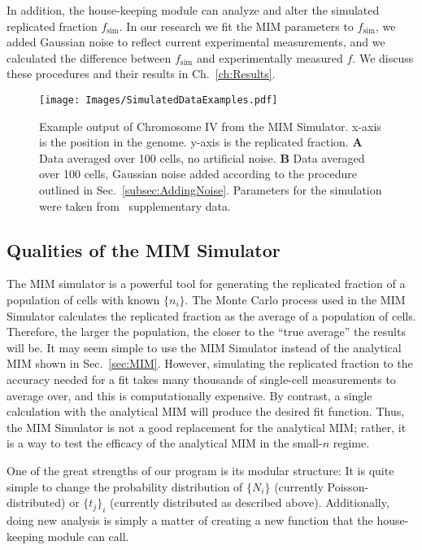 		In addition, the house-keeping module can analyze and alter the simulated replicated fraction $f_\text{sim}$.
		In our research we fit the MIM parameters to $f_\text{sim}$, we added Gaussian noise to reflect current experimental measurements, and we calculated the difference between $f_\text{sim}$ and experimentally measured $f$.
		We discuss these procedures and their results in Ch.~\ref{ch:Results}.
		
		\begin{figure}[tbh]
			\begin{center}
				\texttt{[image: Images/SimulatedDataExamples.pdf]}
			\end{center}
				\caption[Simulated Replicated Fraction Example]{\label{fig:SimulatedExample}
					Example output of Chromosome IV from the MIM Simulator.
					x-axis is the position in the genome.
					y-axis is the replicated fraction.
					\textbf{A} Data averaged over 100 cells, no artificial noise.
					\textbf{B} Data averaged over 100 cells, Gaussian noise added according to the procedure outlined in Sec.~\ref{subsec:AddingNoise}.
					Parameters for the simulation were taken from~\cite{ScottsPaper} supplementary data.
				}
		\end{figure}	
		
		
		\subsection{Qualities of the MIM Simulator}
		\label{subsec:QualitiesofMIMSimulator}
		
		The MIM simulator is a powerful tool for generating the replicated fraction of a population of cells with known $\{n_i\}$.
		The Monte Carlo process used in the MIM Simulator calculates the replicated fraction as the average of a population of cells.
		Therefore, the larger the population, the closer to the ``true average'' the results will be.
		It may seem simple to use the MIM Simulator instead of the analytical MIM shown in Sec.~\ref{sec:MIM}.
		However, simulating the replicated fraction to the accuracy needed for a fit takes many thousands of single-cell measurements to average over, and this is computationally expensive.
		By contrast, a single calculation with the analytical MIM will produce the desired fit function.
		Thus, the MIM Simulator is not a good replacement for the analytical MIM; rather, it is a way to test the efficacy of the analytical MIM in the small-$n$ regime.
		
		One of the great strengths of our program is its modular structure: It is quite simple to change the probability distribution of $\{N_i\}$ (currently Poisson-distributed) or $\{t_j\}_i$ (currently distributed as described above).
		Additionally, doing new analysis is simply a matter of creating a new function that the house-keeping module can call.
		
